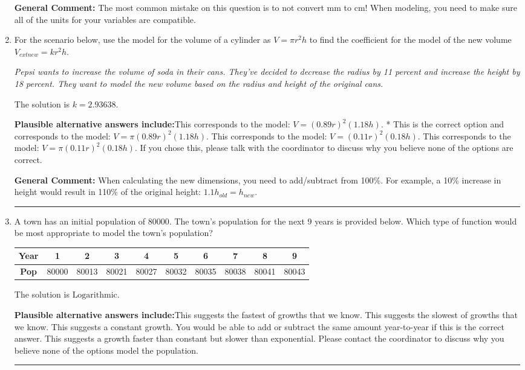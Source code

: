 \documentclass{extbook}[14pt]
\newcommand{\litem}[1]{\item #1

\rule{\textwidth}{0.4pt}}
\begin{document}
\begin{enumerate}
{\textbf{General Comment:} The most common mistake on this question is to not convert mm to cm! When modeling, you need to make sure all of the units for your variables are compatible.
}
\litem{
For the scenario below, use the model for the volume of a cylinder as $V = \pi r^2 h$ to find the coefficient for the model of the new volume $V_{	ext{new}} = k r^2 h$.

\begin{center}
    \textit{ Pepsi wants to increase the volume of soda in their cans. They've decided to decrease the radius by 11 percent and increase the height by 18 percent. They want to model the new volume based on the radius and height of the original cans. }
\end{center}
The solution is \( k = 2.93638 \).\begin{enumerate}[label=\Alph*.]
\textbf{Plausible alternative answers include:}This corresponds to the model: $V = (0.89 r)^2 (1.18 h)$.
* This is the correct option and corresponds to the model: $V = \pi (0.89 r)^2 (1.18 h)$.
This corresponds to the model: $V = (0.11 r)^2 (0.18 h)$.
This corresponds to the model: $V = \pi (0.11 r)^2 (0.18 h)$.
If you chose this, please talk with the coordinator to discuss why you believe none of the options are correct.
\end{enumerate}

\textbf{General Comment:} When calculating the new dimensions, you need to add/subtract from 100\%. For example, a 10\% increase in height would result in 110\% of the original height: $1.1h_{old} = h_{new}$.
}
\litem{
A town has an initial population of 80000. The town's population for the next 9 years is provided below. Which type of function would be most appropriate to model the town's population?


\begin{tabular}{c|c|c|c|c|c|c|c|c|c}
\textbf{Year} &1 &2 &3 &4 &5 &6 &7 &8 &9\tabularnewline \hline
\textbf{Pop} &80000 &80013 &80021 &80027 &80032 &80035 &80038 &80041 &80043\end{tabular}The solution is \( \text{Logarithmic} \).\begin{enumerate}[label=\Alph*.]
\textbf{Plausible alternative answers include:}This suggests the fastest of growths that we know.
This suggests the slowest of growths that we know.
This suggests a constant growth. You would be able to add or subtract the same amount year-to-year if this is the correct answer.
This suggests a growth faster than constant but slower than exponential.
Please contact the coordinator to discuss why you believe none of the options model the population.
\end{enumerate}

}
\end{enumerate}
\end{document}
